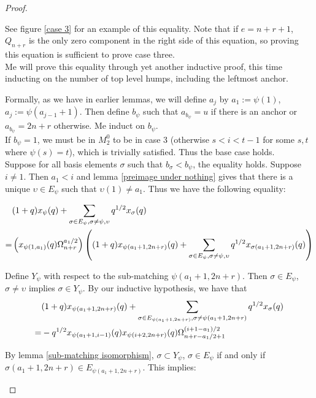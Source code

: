 \documentclass{amsart}
\begin{document}
\begin{proof}
\begin{enumerate}[label={case \arabic*:}]
 		
 		See figure \ref{case 3} for an example of this equality. Note that if $e=n+r+1$, $Q_{n+r}$ is the only zero component in the right side of this equation, so proving this equation is sufficient to prove case three.
 		\\
 		
 		Me will prove this equality through yet another inductive proof, this time inducting on the number of top level humps, including the leftmost anchor.
 		
 		Formally, as we have in earlier lemmas, we will define $a_j$ by $a_1:=\psi(1)$, $a_j:=\psi(a_{j-1}+1)$. Then define $b_\psi$ such that $a_{b_\psi}=u$ if there is an anchor or $a_{b_\psi}=2n+r$ otherwise. Me induct on $b_\psi$.
 		\\
 		
 		If $b_\psi=1$, we must be in $M_2^0$ to be in case 3 (otherwise $s<i<t-1$ for some $s,t$ where $\psi(s)=t$), which is trivially satisfied. Thus the base case holds.
 		\\
 		
 		Suppose for all basis elements $\sigma$ such that $b_\sigma<b_\psi$, the equality holds. Suppose $i\not=1$. Then $a_1<i$ and lemma \ref{preimage under nothing} gives that there is a unique $\upsilon\in E_\psi$ such that $\upsilon(1)\not=a_1$. Thus we have the following equality:
 		
 		\begin{align*}
 		&(1+q)x_\psi(q)+\sum_{\sigma\in E_\psi,\sigma\not=\psi,\upsilon}q^{1/2}x_\sigma(q)\\
 		=&\left( x_{\psi(1,a_1)}(q)\Omega_{n+r}^{a_1/2} \right)\left( (1+q)x_{\psi(a_1+1,2n+r)}(q)+\sum_{\sigma\in E_\psi,\sigma\not=\psi,\upsilon}q^{1/2}x_{\sigma(a_1+1,2n+r)}(q) \right)
 		\end{align*}
 		
 		Define $Y_\psi$ with respect to the sub-matching $\psi(a_1+1,2n+r)$. Then $\sigma\in E_\psi$, $\sigma\not=\upsilon$ implies $\sigma\in Y_\psi$. By our inductive hypothesis, we have that 
 		\begin{align*}
 		&(1+q)x_{\psi(a_1+1,2n+r)}(q)+\sum_{\sigma\in E_{\psi(a_1+1,2n+r)},\sigma\not=\psi(a_1+1,2n+r)}q^{1/2}x_{\sigma}(q)\\
 		=&-q^{1/2}x_{\psi(a_1+1,i-1)}(q)x_{\psi(i+2,2n+r)}(q)\Omega_{n+r-a_1/2+1}^{(i+1-a_1)/2}
 		\end{align*}
 		
 		
 		By lemma \ref{sub-matching isomorphism}, $\sigma\subset Y_\psi$, $\sigma\in E_\psi$ if and only if $\sigma(a_1+1,2n+r)\in E_{\psi(a_1+1,2n+r)}$. This implies:
 		

\end{enumerate}
\end{proof}
\end{document}
